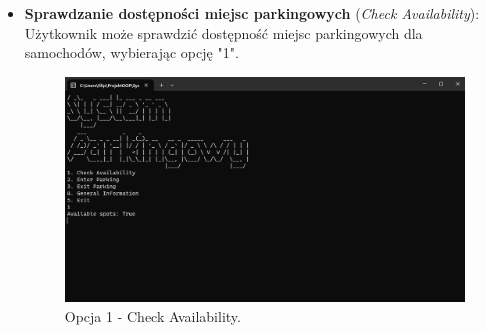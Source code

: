 \documentclass{article}
\begin{document}
\begin{itemize}
    \item \textbf{Sprawdzanie dostępności miejsc parkingowych} (\textit{Check Availability}):
    Użytkownik może sprawdzić dostępność miejsc parkingowych dla samochodów, wybierając opcję "1". 

    \begin{figure}[H]
    \centering
    \includegraphics[width=\textwidth]{photos/avail.png}
    \caption{Opcja 1 - Check Availability.}
    \end{figure}


\end{itemize}
\end{document}
